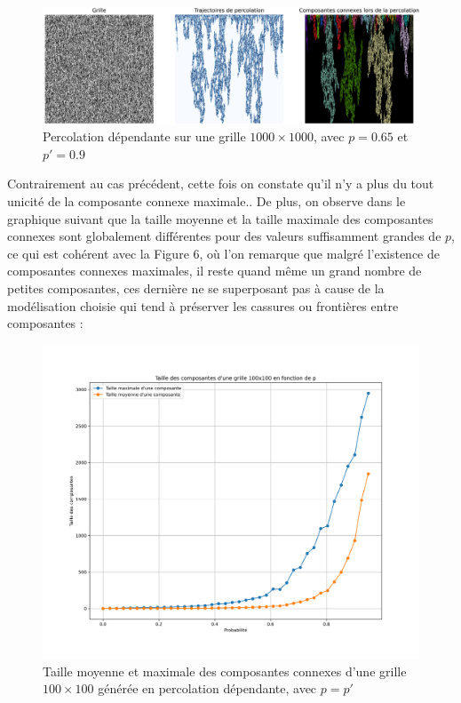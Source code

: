 \documentclass[11pt,a4paper]{article}
\begin{document}
\begin{figure}[htp]
    \centering
    \includegraphics[width=1 \textwidth]{./Pictures/fissure.png}
    \caption{Percolation dépendante sur une grille $1000\times 1000$, avec $p=0.65$ et $p'=0.9$}
    \label{fig:fissure}
\end{figure}

%
%

Contrairement au cas précédent, cette fois on constate qu'il n'y a plus du tout unicité de la composante connexe maximale.. De plus, on observe dans le graphique suivant que la taille moyenne et la taille maximale des composantes connexes sont globalement différentes pour des valeurs suffisamment grandes de $p$, ce qui est cohérent avec la Figure $6$, où l'on remarque que malgré l'existence de composantes connexes maximales, il reste quand même un grand nombre de petites composantes, ces dernière ne se superposant pas à cause de la modélisation choisie qui tend à préserver les cassures ou frontières entre composantes :

\begin{figure}[htbp]
    \centering
    \includegraphics[width=0.67 \textwidth]{./Pictures/taille_dep.png}
    \caption{Taille moyenne et maximale des composantes connexes d'une grille $100\times 100$ générée en percolation dépendante, avec $p=p'$}
    \label{fig:phase_dep}
\end{figure}

\newpage
\printbibliography[heading=bibintoc, title={Références}]
\end{document}
